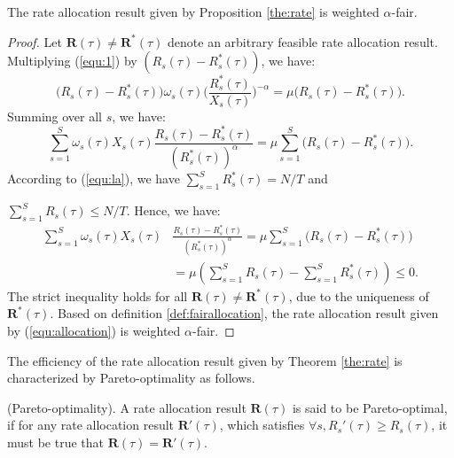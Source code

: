 	\begin{theorem}
		The rate allocation result given by Proposition \ref{the:rate} is weighted $\alpha$-fair.  
	\end{theorem}
	
	\begin{proof}
    Let $\pmb{R}(\tau) \ne \pmb{R}^*(\tau)$ denote an arbitrary feasible rate allocation result. Multiplying  (\ref{equ:1}) by $(R_s(\tau) - R_s^*(\tau))$, we have:
    \begin{displaymath}
    \big(R_s(\tau) - R_s^*(\tau)\big)\omega_s(\tau) \big(\frac{R_s^*(\tau)}{X_s(\tau)}\big)^{-\alpha} = \mu \big(R_s(\tau) - R_s^*(\tau)\big).
    \end{displaymath} 
    Summing over all $s$, we have:
    \begin{displaymath}
    \sum_{s=1}^S\omega_s(\tau) X_s(\tau)\frac{R_s(\tau) - R_s^*(\tau)}{(R_s^*(\tau))^{\alpha}}  = \mu \sum_{s=1}^S\big(R_s(\tau) - R_s^*(\tau)\big).
    \end{displaymath} 
     According to (\ref{equ:la}), we have $\sum_{s=1}^{S} R_s^*(\tau) = {N}/{T}$ and
     
     \noindent$\sum_{s=1}^{S} R_s(\tau) \le {N}/{T}$. Hence, we have:
     \begin{displaymath}
     \begin{split}
     \sum_{s=1}^S\omega_s(\tau) X_s(\tau)&\frac{R_s(\tau) - R_s^*(\tau)}{(R_s^*(\tau))^{\alpha}} = \mu \sum_{s=1}^S\big(R_s(\tau) - R_s^*(\tau)\big) \\
     &= \mu (\sum_{s = 1}^S R_s(\tau) -\sum_{s=1}^S R_s^*(\tau)) \le 0.
     \end{split}
     \end{displaymath}
     The strict inequality holds for all $\pmb{R}(\tau)\ne \pmb{R}^*(\tau)$, due to the uniqueness of $\pmb{R}^*(\tau)$. Based on definition \ref{def:fairallocation}, the rate allocation result given by (\ref{equ:allocation}) is weighted $\alpha$-fair.  
	\end{proof}
	
	The efficiency of the rate allocation result given by Theorem \ref{the:rate} is characterized by Pareto-optimality as follows. 
	
	\begin{definition}(Pareto-optimality). A rate allocation result $\pmb{R}(\tau)$ is said to be Pareto-optimal, if for any rate allocation result $\pmb{R}'(\tau)$, which satisfies $\forall s, R_s'(\tau) \ge R_s(\tau)$,  it must be true that $\pmb{R}(\tau) = \pmb{R}'(\tau)$. 
	\end{definition}
	
